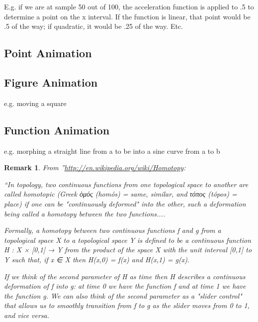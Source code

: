\documentclass[12pt]{tufte-handout}
\numberwithin{equation}{subsection}
\numberwithin{equation}{subsection}
\newtheorem{remark}{Remark}
\begin{document}
  E.g. if we are at sample 50 out of 100, the acceleration function is
  applied to .5 to determine a point on the x interval.  If the
  function is linear, that point would be .5 of the way; if quadratic,
  it would be .25 of the way.  Etc.

  \subsection{Point Animation}
  \label{subs:ptanim}

  \subsection{Figure Animation}
  \label{subs:figanim}

  e.g. moving a square

  \subsection{Function Animation}
  \label{subs:funcanim}

  e.g. morphing a straight line from a to be into a sine curve from a to b

  \begin{remark}
    From ''\url{http://en.wikipedia.org/wiki/Homotopy}:

    ``In topology, two continuous functions from one topological space
    to another are called homotopic (Greek ὁμός (homós) = same,
    similar, and τόπος (tópos) = place) if one can be "continuously
    deformed" into the other, such a deformation being called a
    homotopy between the two functions....

    Formally, a homotopy between two continuous functions f and g from
    a topological space X to a topological space Y is defined to be a
    continuous function H : X × [0,1] → Y from the product of the
    space X with the unit interval [0,1] to Y such that, if x ∈ X then
    H(x,0) = f(x) and H(x,1) = g(x).

    If we think of the second parameter of H as time then H describes a continuous deformation of f into g: at time 0 we have the function f and at time 1 we have the function g. We can also think of the second parameter as a "slider control" that allows us to smoothly transition from f to g as the slider moves from 0 to 1, and vice versa.
  \end{remark}


\end{document}
